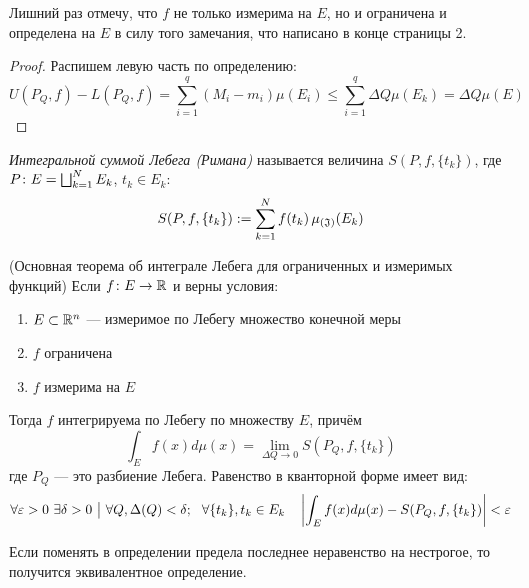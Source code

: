 \begin{anote}
	Лишний раз отмечу, что $f$ не только измерима на $E$, но и ограничена и определена на $E$ в силу того замечания, что написано в конце страницы 2.
\end{anote}

\begin{proof}
	Распишем левую часть по определению:
	\[
		U(P_Q, f) - L(P_Q, f) = \sum_{i = 1}^q (M_i - m_i)\mu(E_i) \le \sum_{i = 1}^q \Delta Q\mu(E_k) = \Delta Q \mu(E)
	\]
\end{proof}

\begin{definition}
	\textit{Интегральной суммой Лебега (Римана)} называется величина $S(P, f, \{t_k\})$, где $P \colon E = \bigsqcup_{k = 1}^N E_k$, $t_k \in E_k$:
	\[
		S(P, f, \{t_k\}) := \sum_{k = 1}^N f(t_k) \operatorname{\mu_{(\mathfrak{J})}}(E_k)
	\]
\end{definition}

\begin{theorem} (Основная теорема об интеграле Лебега для ограниченных и измеримых функций)
	Если $f \colon E \to \mathbb{R}$ и верны условия:
	\begin{enumerate}
		\item $E \subset \mathbb{R}^n$ --- измеримое по Лебегу множество конечной меры
		
		\item $f$ ограничена
		
		\item $f$ измерима на $E$
	\end{enumerate}
	Тогда $f$ интегрируема по Лебегу по множеству $E$, причём
	\[
		\int_E f(x)d\mu(x) = \lim_{\Delta Q \to 0} S(P_Q, f, \{t_k\})
	\]
	где $P_Q$ --- это разбиение Лебега. Равенство в кванторной форме имеет вид:
	\[
		\forall \varepsilon > 0\ \exists \delta > 0 \ \big|\  \forall Q, \Delta(Q) < \delta;\ \ \forall \{t_k\}, t_k \in E_k \quad \left|\int_E f(x)d\mu(x) - S(P_Q, f, \{t_k\})\right| < \varepsilon
	\]
\end{theorem}

\begin{reminder}
	Если поменять в определении предела последнее неравенство на нестрогое, то получится эквивалентное определение.
\end{reminder}

